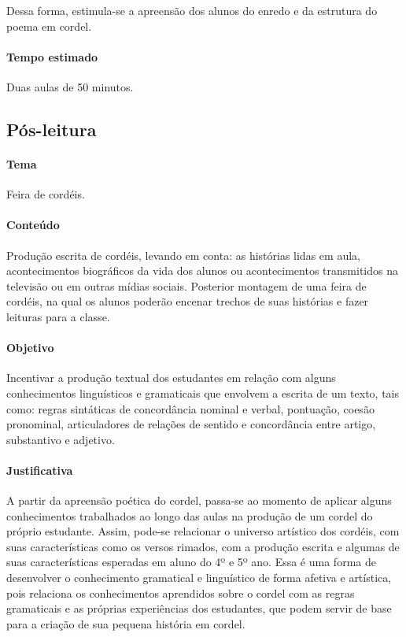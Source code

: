 \documentclass[11pt]{extarticle}
\begin{document}
Dessa forma, estimula-se a apreensão dos alunos do enredo e da estrutura do poema em cordel.

\paragraph{Tempo estimado} Duas aulas de 50 minutos.

\subsection{Pós-leitura}

\paragraph{Tema} Feira de cordéis.



\paragraph{Conteúdo} Produção escrita de cordéis, levando em conta: as histórias lidas em aula, acontecimentos biográficos da vida dos alunos ou acontecimentos transmitidos na televisão ou em outras mídias sociais. Posterior montagem de uma feira de cordéis, na qual os alunos poderão encenar trechos de suas histórias e fazer leituras para a classe.

\paragraph{Objetivo} Incentivar a produção textual dos estudantes em relação com alguns conhecimentos linguísticos e gramaticais que envolvem a escrita de um texto, tais como: regras sintáticas de concordância nominal e verbal, pontuação, coesão pronominal, articuladores de relações de sentido e concordância entre artigo, substantivo e adjetivo.


\paragraph{Justificativa} A partir da apreensão poética do cordel, passa-se ao momento de aplicar alguns conhecimentos trabalhados ao longo das aulas na produção de um cordel do próprio estudante. Assim, pode-se relacionar o universo artístico dos cordéis, com suas características como os versos rimados, com a produção escrita e algumas de suas características esperadas em aluno do 4º e 5º ano. Essa é uma forma de desenvolver o conhecimento gramatical e linguístico de forma afetiva e artística, pois relaciona os conhecimentos aprendidos sobre o cordel com as regras gramaticais e as próprias experiências dos estudantes, que podem servir de base para a criação de sua pequena história em cordel.
\end{document}
